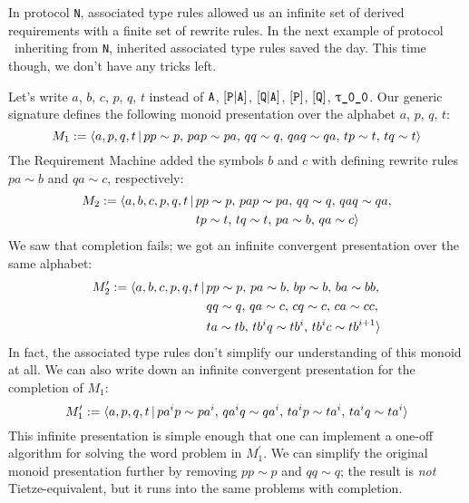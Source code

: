 \documentclass[../generics]{subfiles}
\begin{document}
\begin{example}
In protocol \texttt{N}, associated type rules allowed us an infinite set of derived requirements with a finite set of rewrite rules. In the next example of protocol \tQ\ inheriting from \texttt{N}, inherited associated type rules saved the day. This time though, we don't have any tricks left.

\smallskip

Let's write $a$, $b$, $c$, $p$, $q$, $t$ instead of $\texttt{A}$, $[\texttt{P}|\texttt{A}]$, $[\texttt{Q}|\texttt{A}]$, $[\texttt{P}]$, $[\texttt{Q}]$, $\rT$. Our generic signature defines the following monoid presentation over the alphabet $a$, $p$, $q$, $t$:
\[M_1 := \langle a,p,q,t\,|\,pp\sim p,\,pap\sim pa,\,qq\sim q,\, qaq\sim qa,\, tp\sim t,\, tq\sim t\rangle\]
The Requirement Machine added the symbols $b$ and $c$ with defining rewrite rules $pa\sim b$ and $qa\sim c$, respectively:
\begin{align*}
M_2 := \langle a,b,c,p,q,t\,|\,\hbox{}&pp\sim p,\,pap\sim pa,\,qq\sim q,\, qaq\sim qa,\\
&tp\sim t,\, tq\sim t,\,pa\sim b,\,qa\sim c\rangle
\end{align*}
We saw that completion fails; we got an infinite convergent presentation over the same alphabet:
\begin{align*}
M_2^\prime := \langle a,b,c,p,q,t\,|\,\hbox{}&pp\sim p,\,pa\sim b,\,bp\sim b,\,ba\sim bb,\\
&qq\sim q,\,qa\sim c,\,cq\sim c,\,ca\sim cc,\\
&ta\sim tb,\, tb^iq\sim tb^i,\,tb^ic\sim tb^{i+1}\rangle
\end{align*}
In fact, the associated type rules don't simplify our understanding of this monoid at all. We can also write down an infinite convergent presentation for the completion of $M_1$:
\[M_1^\prime := \langle a,p,q,t\,|\,pa^ip\sim pa^i,\, qa^iq\sim qa^i,\, ta^ip\sim ta^i,\, ta^iq\sim ta^i\rangle\]
This infinite presentation is simple enough that one can implement a one-off algorithm for solving the word problem in $M_1^\prime$. We can simplify the original monoid presentation further by removing $pp\sim p$ and $qq\sim q$; the result is \emph{not} Tietze-equivalent, but it runs into the same problems with completion.


\end{example}
\end{document}
